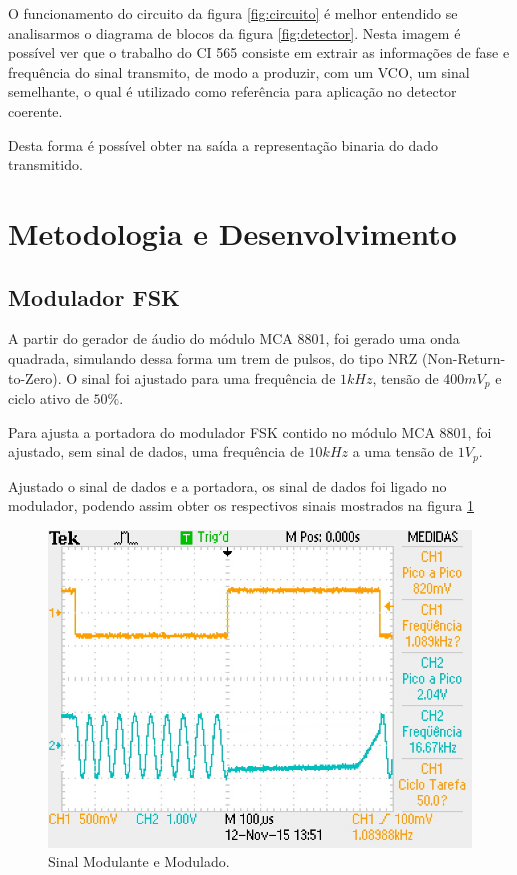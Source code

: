 \documentclass[12pt,a4paper]{article}%
\begin{document}
O funcionamento do circuito da figura \ref{fig:circuito} é melhor entendido se analisarmos o diagrama de blocos da figura \ref{fig:detector}. Nesta imagem é possível ver que o trabalho do CI 565 consiste em extrair as informações de fase e frequência do sinal transmito, de modo a produzir, com um VCO, um sinal semelhante, o qual é utilizado como referência para aplicação no detector coerente.

Desta forma é possível obter na saída a representação binaria do dado transmitido.

\newpage


\section{Metodologia e Desenvolvimento}

\subsection{Modulador FSK}

A partir do gerador de áudio do módulo MCA 8801, foi gerado uma onda quadrada, simulando dessa forma um trem de pulsos, do tipo NRZ (Non-Return-to-Zero). O sinal foi ajustado para uma frequência de $1 kHz$, tensão de $400 mV_p$ e ciclo ativo de $50 \%$.

Para ajusta a portadora do modulador FSK contido no módulo MCA 8801, foi ajustado, sem sinal de dados, uma frequência de $10 kHz$ a uma tensão de $1 V_p$. 

Ajustado o sinal de dados e a portadora, os sinal de dados foi ligado no modulador, podendo assim obter os respectivos sinais mostrados na figura \ref{fig:00}


\begin{figure}[H]
\centering
\includegraphics[scale=0.5]{imagem/TEK0000}
\caption{Sinal Modulante e Modulado.}
\label{fig:00}
\end{figure}
\end{document}
